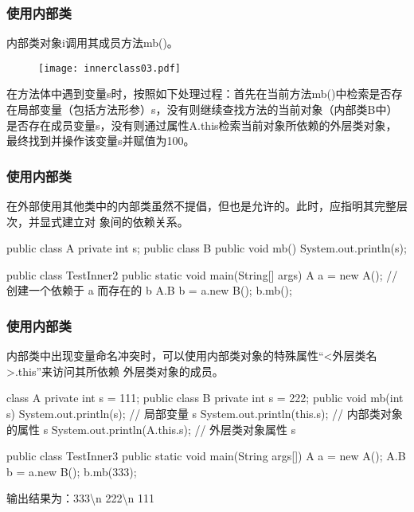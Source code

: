 \begin{frame}[fragile] %
\frametitle{使用内部类}


内部类对象i调用其成员方法mb()。

\begin{figure}
\centering
\texttt{[image: innerclass03.pdf]}
\end{figure}

{\kai\small 在方法体中遇到变量s时，按照如下处理过程：首先在当前方法mb()中检索是否存在局部变量（包括方法形参）s，没有则继续查找方法的当前对象（内部类B中）是否存在成员变量s，没有则通过属性A.this检索当前对象所依赖的外层类对象，最终找到并操作该变量s并赋值为100。}
\end{frame}

\begin{frame}[fragile] %
\frametitle{使用内部类}

在外部使用其他类中的内部类虽然不提倡，但也是允许的。此时，应指明其完整层次，并显式建立对
象间的依赖关系。

\begin{javaCode}
public class A {
  private int s;
  public class B {
    public void mb() {
      System.out.println(s);
    }
  }
}
\end{javaCode}
\begin{javaCode}
public class TestInner2 {
  public static void main(String[] args) {
    A a = new A();
    // 创建一个依赖于 a 而存在的 b
    A.B b = a.new B();
    b.mb();
  }
}
\end{javaCode}
\end{frame}

\begin{frame}[fragile] %
\frametitle{使用内部类}

内部类中出现变量命名冲突时，可以使用内部类对象的特殊属性“<外层类名>.this”来访问其所依赖
外层类对象的成员。
\begin{javaCode}
class A {
  private int s = 111;
  public class B {
    private int s = 222;
    public void mb(int s) {
      System.out.println(s);  // 局部变量 s
      System.out.println(this.s);  // 内部类对象的属性 s
      System.out.println(A.this.s); // 外层类对象属性 s
    }
  }
}

public class TestInner3 {
  public static void main(String args[]) {
    A a = new A();
    A.B b = a.new B();
    b.mb(333);
  }
}
\end{javaCode}
{\small\Mage 输出结果为：333\textbackslash n 222\textbackslash n 111}
\end{frame}

